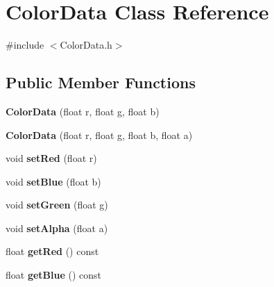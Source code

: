 \hypertarget{classColorData}{\section{Color\-Data Class Reference}
\label{classColorData}
}


{\ttfamily \#include $<$Color\-Data.\-h$>$}

\subsection*{Public Member Functions}
\begin{DoxyCompactItemize}
\item 
\hypertarget{classColorData_a920b0332685ef72147fe19020fdac5d6}{{\bfseries Color\-Data} (float r, float g, float b)}\label{classColorData_a920b0332685ef72147fe19020fdac5d6}

\item 
\hypertarget{classColorData_a0ecce2c6c597d9379ebb329883298dfd}{{\bfseries Color\-Data} (float r, float g, float b, float a)}\label{classColorData_a0ecce2c6c597d9379ebb329883298dfd}

\item 
\hypertarget{classColorData_aa2e401956936f87a560b8f579514bf69}{void {\bfseries set\-Red} (float r)}\label{classColorData_aa2e401956936f87a560b8f579514bf69}

\item 
\hypertarget{classColorData_a01bbba90cac0bc1b3bd01d4aecc16477}{void {\bfseries set\-Blue} (float b)}\label{classColorData_a01bbba90cac0bc1b3bd01d4aecc16477}

\item 
\hypertarget{classColorData_a4a7833dfef4a33eee3857de09a72aee1}{void {\bfseries set\-Green} (float g)}\label{classColorData_a4a7833dfef4a33eee3857de09a72aee1}

\item 
\hypertarget{classColorData_a547fb7bd1616e8657a825cb9a34c43c1}{void {\bfseries set\-Alpha} (float a)}\label{classColorData_a547fb7bd1616e8657a825cb9a34c43c1}

\item 
\hypertarget{classColorData_ab7066467c08dfad868fc4b1add70c2f2}{float {\bfseries get\-Red} () const }\label{classColorData_ab7066467c08dfad868fc4b1add70c2f2}

\item 
\hypertarget{classColorData_ad9c600256c8abefdd76209fc1f68fcb5}{float {\bfseries get\-Blue} () const }\label{classColorData_ad9c600256c8abefdd76209fc1f68fcb5}


\end{DoxyCompactItemize}

